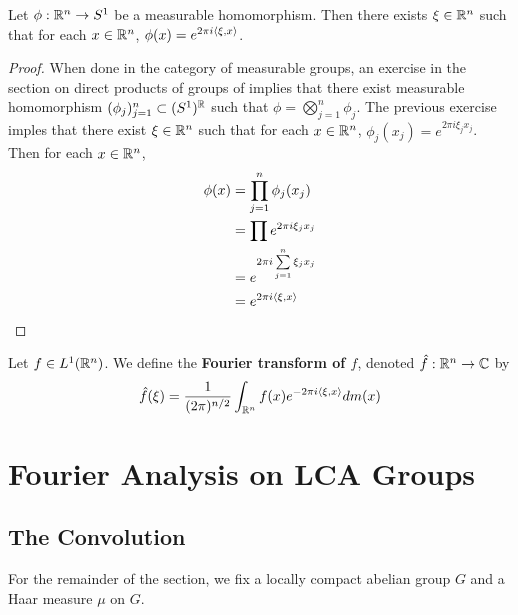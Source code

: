 \documentclass{book}
\begin{document}
	\begin{ex}
	 Let $\phi: \mathbb{R}^n \rightarrow S^1$ be a measurable homomorphism. Then there exists $\xi \in \mathbb{R}^n$ such that for each $x \in \mathbb{R}^n$, $\phi(x) = e^{2 \pi i \langle \xi, x\rangle}$. 
	\end{ex}	
	
	\begin{proof}
	When done in the category of measurable groups, an exercise in the section on direct products of groups of \cite{groups}
	implies that there exist measurable homomorphism $(\phi_{j})_{j=1}^n \subset (S^1)^{\mathbb{R}}$ such that $\phi = \bigotimes_{j=1}^n \phi_j$. The previous exercise imples that there exist $\xi \in \mathbb{R}^n$ such that for each $x \in \mathbb{R}^n$, $\phi_j(x_j) = e^{2 \pi i \xi_j x_j}$. Then for each $x \in \mathbb{R}^n$, 
	\begin{align*}
	\phi(x)
	&= \prod_{j=1}^n \phi_j(x_j) \\
	&= \prod e^{2 \pi i \xi_j x_j} \\
	&= e^{2 \pi i \sum\limits_{j=1}^n  \xi_j x_j }\\
	&= e^{2 \pi i \langle \xi, x \rangle}
	\end{align*}
	\end{proof}
	
	\begin{defn}
	 Let $f \in L^1(\mathbb{R}^n)$. We define the \textbf{Fourier transform of $f$}, denoted $\hat{f}: \mathbb{R}^n \rightarrow \mathbb{C}$ by 
	$$\hat{f}(\xi) = \frac{1}{(2 \pi)^{n / 2}} \int_{\mathbb{R}^n} f(x) e^{- 2 \pi i \langle \xi , x\rangle} dm(x)$$
	\end{defn}
	
	
	
	
	
	
	
	
	
	
	
	
	
	
	\newpage
	\chapter{Fourier Analysis on LCA Groups}
	
	
	

	\section{The Convolution}	
	\begin{note}
	For the remainder of the section, we fix a locally compact abelian group $G$ and a Haar measure $\mu$ on $G$. 
	\end{note}
	
\end{document}
